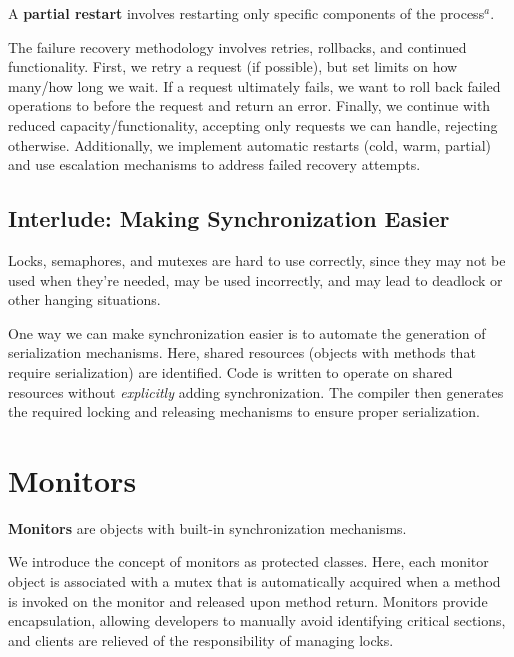 \documentclass{report}
\newcommand{\definitionBegin}[1]{\begin{tcolorbox}[title={Definition: #1}]}
\newcommand{\definitionEnd}{\end{tcolorbox}}
\begin{document}
\definitionBegin{Partial Restart}
A \textbf{partial restart} involves restarting only specific components of the process$^a$.
\definitionEnd

The failure recovery methodology involves retries, rollbacks, and continued functionality. First, we
retry a request (if possible), but set limits on how many/how long we wait. If a request ultimately
fails, we want to roll back failed operations to before the request and return an error. Finally, we
continue with reduced capacity/functionality, accepting only requests we can handle, rejecting
otherwise. Additionally, we implement automatic restarts (cold, warm, partial) and use escalation
mechanisms to address failed recovery attempts.


\subsection*{Interlude: Making Synchronization Easier}
Locks, semaphores, and mutexes are hard to use correctly, since they may not be used when they're
needed, may be used incorrectly, and may lead to deadlock or other hanging situations.

One way we can make synchronization easier is to automate the generation of serialization
mechanisms. Here, shared resources (objects with methods that require serialization) are
identified. Code is written to operate on shared resources without \textit{explicitly} adding
synchronization. The compiler then generates the required locking and releasing mechanisms to ensure
proper serialization.





\section{Monitors}
\definitionBegin{Monitors}
\textbf{Monitors} are objects with built-in synchronization mechanisms.
\definitionEnd

We introduce the concept of monitors as protected classes. Here, each monitor object is associated
with a mutex that is automatically acquired when a method is invoked on the monitor and released
upon method return. Monitors provide encapsulation, allowing developers to manually avoid
identifying critical sections, and clients are relieved of the responsibility of managing locks.
\end{document}
